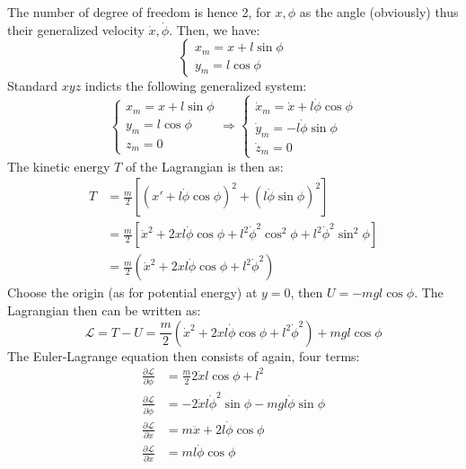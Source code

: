 The number of degree of freedom is hence 2, for $x,\phi$ as the angle (obviously) thus their generalized velocity $\dot{x},\dot{\phi}$. Then, we have: 
\begin{equation}
    \begin{cases}
        x_{m} = x + l\sin{\phi}\\
        y_{m} = l\cos{\phi}
    \end{cases}
\end{equation}
Standard $xyz$ indicts the following generalized system: 
\begin{equation}
    \begin{cases}
        x_{m} = x + l\sin{\phi}\\
        y_{m} = l\cos{\phi}\\
        z_{m} = 0
    \end{cases}
    \Rightarrow \begin{cases}
        \dot{x}_{m} = \dot{x} + l \dot{\phi} \cos{\phi}\\
        \dot{y}_{m} = -l \dot{\phi}\sin{\phi}\\
        \dot{z}_{m} = 0
    \end{cases}
\end{equation}
The kinetic energy $T$ of the Lagrangian is then as: 
\begin{equation}
    \begin{split}
        T 
        & = \frac{m}{2} \left[ (x'+l \dot{\phi}\cos{\phi})^{2} + (l\dot{\phi}\sin{\phi})^{2} \right]\\
        & = \frac{m}{2} \left[ \dot{x}^{2} + 2x l\dot{\phi}\cos{\phi} + l^{2}\dot{\phi}^{2}\cos^{2}{\phi} + l^{2}\dot{\phi}^{2}\sin^{2}{\phi} \right]\\
        & = \frac{m}{2} \left( \dot{x}^{2} + 2xl \dot{\phi}\cos{\phi} + l^{2} \dot{\phi}^{2} \right)
    \end{split}
\end{equation}
Choose the origin (as for potential energy) at $y=0$, then $U=-mgl \cos{\phi}$. The Lagrangian then can be written as: 
\begin{equation}
    \mathcal{L} = T - U = \frac{m}{2} \left( \dot{x}^{2} + 2xl \dot{\phi}\cos{\phi} + l^{2} \dot{\phi}^{2} \right) + mgl \cos{\phi}
\end{equation}
The Euler-Lagrange equation then consists of again, four terms: 
\begin{align}
    \frac{\partial \mathcal{L}}{\partial \phi} & = \frac{m}{2}2\dot{x}l \cos{\phi} + l^{2}\\
    \frac{\partial \mathcal{L}}{\partial \dot{\phi}} & = -2\dot{x}l \dot{\phi}^{2}\sin{\phi}- mgl \dot{\phi}\sin{\phi}\\
    \frac{\partial \mathcal{L}}{\partial \dot{x}} & = m \ddot{x} + 2l \dot{\phi}\cos{\phi} \\
    \frac{\partial \mathcal{L}}{\partial x} & = ml \dot{\phi} \cos{\phi} 
\end{align}
